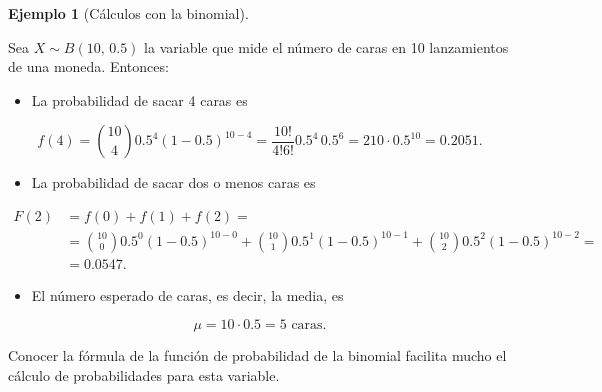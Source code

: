 \documentclass[
  spanish,
  a4paper,
]{scrreport}
\providecommand{\tightlist}{%
  \setlength{\itemsep}{0pt}\setlength{\parskip}{0pt}}
\theoremstyle{plain}
\theoremstyle{definition}
\newtheorem{example}{Ejemplo}[chapter]
\theoremstyle{definition}
\theoremstyle{remark}
\begin{document}
\begin{example}[Cálculos con la
binomial]\protect\hypertarget{exm-binomial-calculos-monedas}{}\label{exm-binomial-calculos-monedas}

Sea \(X\sim B(10,\,0.5)\) la variable que mide el número de caras en 10
lanzamientos de una moneda. Entonces:

\begin{itemize}
\tightlist
\item
  La probabilidad de sacar 4 caras es
\end{itemize}

\[
f(4) = \binom{10}{4}0.5^4 (1-0.5)^{10-4} = \frac{10!}{4!6!}0.5^4\, 0.5^6 = 210\cdot 0.5^{10} = 0.2051.
\]

\begin{itemize}
\tightlist
\item
  La probabilidad de sacar dos o menos caras es
\end{itemize}

\[
\begin{aligned}
F(2) &= f(0) +f(1) + f(2) =\\
&= \binom{10}{0}0.5^0 (1-0.5)^{10-0} + \binom{10}{1}0.5^1 (1-0.5)^{10-1} + \binom{10}{2}0.5^2 (1-0.5)^{10-2} =\\
&= 0.0547.
\end{aligned}
\]

\begin{itemize}
\tightlist
\item
  El número esperado de caras, es decir, la media, es
\end{itemize}

\[
\mu = 10\cdot 0.5 = 5 \mbox{ caras}.
\]

\end{example}

Conocer la fórmula de la función de probabilidad de la binomial facilita
mucho el cálculo de probabilidades para esta variable.
\end{document}
